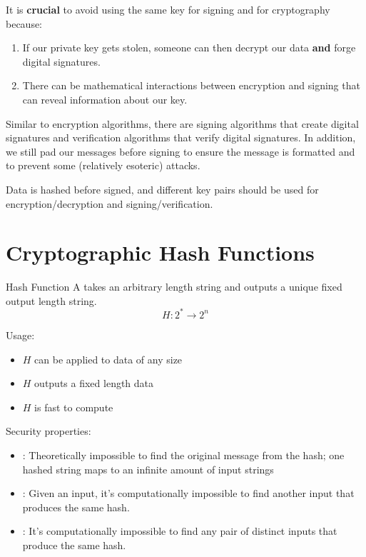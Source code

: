 \documentclass[12pt]{report}
\begin{document}
It is \textbf{crucial} to avoid using the same key for signing and for cryptography because:
\begin{enumerate}[noitemsep]
    \item If our private key gets stolen, someone can then decrypt our data \textbf{and} forge digital signatures.
    \item There can be mathematical interactions between encryption and signing that can reveal information about our key.
\end{enumerate}


Similar to encryption algorithms, there are signing algorithms that create digital signatures and verification algorithms that verify digital signatures. In addition, we still pad our messages before signing to ensure the message is formatted and to prevent some (relatively esoteric) attacks.

Data is hashed before signed, and different key pairs should be used for encryption/decryption and signing/verification.

\section{Cryptographic Hash Functions}

\begin{dfnbox}{Hash Function}{}
    A  takes an arbitrary length string and outputs a unique fixed output length string.
    \tcblower
    \[ H : 2^* \to 2^n \]
\end{dfnbox}

Usage:
\begin{itemize}[noitemsep]
    \item $H$ can be applied to data of any size
    \item $H$ outputs a fixed length data
    \item $H$ is fast to compute
\end{itemize}

Security properties:
\begin{itemize}[noitemsep]
    \item {}: Theoretically impossible to find the original message from the hash; one hashed string maps to an infinite amount of input strings
    \item {}: Given an input, it's computationally impossible to find another input that produces the same hash.
    \item {}: It's computationally impossible to find any pair of distinct inputs that produce the same hash.
\end{itemize}
\end{document}
